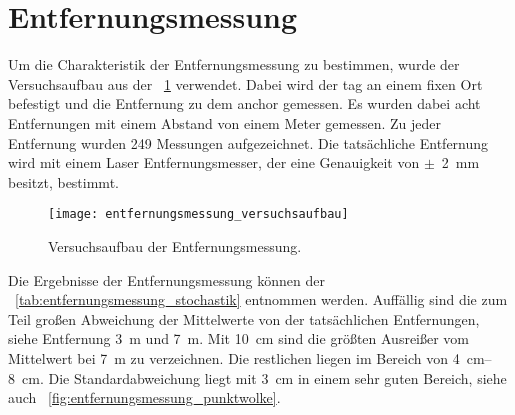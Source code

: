 \begin{comment}
--------------------------------------------------------------------------------
- Mit welchen Einstellungen kommt man auf die Entfernungsmessung?
- Streuung?
- LOS/NLOS {Holz, Bücher, Menschlicher Körper}
	- Welcher Fehler ergibt zwischen LOS/NLOS?
- Wie verändert sich die Genauigkeit der Entfernungsmessung bei einer direkten Sichtverbindung (engl. Line--of--sight (LOS)) und indirekten Sichtverbindung (engl. Non--line--of--sight (NLOS))?
- isaacs2009optimal - Optimal sensor placement for time difference of arrival localization
- Diagramme
	- \cite{kurth2003experimental}
		- Fig. 2: Sample PDFs showing the true ranges associated with 20, 30, and 50 ft measured ranges. (X: true range, Y:count)
		- Fig. 3: The mean true distances to RF tags vs. measured distances (X:measured range, Y: true range)
		- Fig. 4: The variance in true distances to RF tags vs. measured distances (X:measured range (ft), Y: variance (ft^2))
	
- https://matheguru.com/stochastik/standardfehler.html
- https://de.wikipedia.org/wiki/Standardfehler
	
\end{comment}
\section{Entfernungsmessung}

Um die Charakteristik der Entfernungsmessung zu bestimmen, wurde der Versuchsaufbau aus der \figurename~\ref{fig:entfernungsmessung_versuchsaufbau} verwendet. Dabei wird der \Gls{tag} an einem fixen Ort befestigt und die Entfernung zu dem \Gls{anchor} gemessen. Es wurden dabei acht Entfernungen mit einem Abstand von einem Meter gemessen. Zu jeder Entfernung wurden \num{249} Messungen aufgezeichnet. Die tatsächliche Entfernung wird mit einem Laser Entfernungsmesser, der eine Genauigkeit von $\pm$~\SI{2}{\milli\meter} besitzt, bestimmt.

\begin{figure}[ht!]
  \centering
  \texttt{[image: entfernungsmessung\_versuchsaufbau]}
	\caption{Versuchsaufbau der Entfernungsmessung.}
	\label{fig:entfernungsmessung_versuchsaufbau}
\end{figure}

Die Ergebnisse der Entfernungsmessung können der \tablename~\ref{tab:entfernungsmessung_stochastik} entnommen werden. Auffällig sind die zum Teil großen Abweichung der Mittelwerte von der tatsächlichen Entfernungen, siehe Entfernung \SI{3}{\meter} und \SI{7}{\meter}. Mit \SI{10}{\centi\meter} sind die größten Ausreißer vom Mittelwert bei \SI{7}{\meter} zu verzeichnen. Die restlichen liegen im Bereich von \SIrange{4}{8}{\centi\meter}. Die Standardabweichung liegt mit \SI{3}{\centi\meter} in einem sehr guten Bereich, siehe auch \figurename~\ref{fig:entfernungsmessung_punktwolke}.

